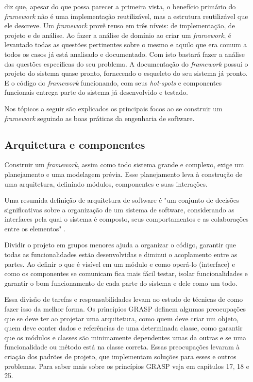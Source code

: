 \cite{Fayad1999} diz que, apesar do que possa parecer a primeira vista, o benefício primário do \textit{framework} não é uma implementação reutilizável, mas a estrutura reutilizável que ele descreve. Um \textit{framework} provê reuso em três níveis: de implementação, de projeto e de análise. Ao fazer a análise de domínio ao criar um \textit{framework}, é levantado todas as questões pertinentes sobre o mesmo e aquilo que era comum a todos os casos já está analisado e documentado. Com isto bastará fazer a análise das questões específicas do seu problema. A documentação do \textit{framework} possui o projeto do sistema quase pronto, fornecendo o esqueleto do seu sistema já pronto. E o código do \textit{framework} funcionando, com seus \textit{hot-spots} e componentes funcionais entrega parte do sistema já desenvolvido e testado.

Nos tópicos a seguir são explicados os principais focos ao se construir um \textit{framework} seguindo as boas práticas da engenharia de software.

\subsection{Arquitetura e componentes}

Construir um \textit{framework}, assim como todo sistema grande e complexo, exige um planejamento e uma modelagem prévia. Esse planejamento leva à construção de uma arquitetura, definindo módulos, componentes e suas interações.

Uma resumida definição de arquitetura de software é "um conjunto de decisões significativas sobre a organização de um sistema de software, considerando as interfaces pela qual o sistema é composto, seus comportamentos e as colaborações entre os elementos" \cite{Larman2005}.

Dividir o projeto em grupos menores ajuda a organizar o código, garantir que todas as funcionalidades estão desenvolvidas e diminui o acoplamento entre as partes. Ao definir o que é visível em um módulo e como operá-lo (interface) e como os componentes se comunicam fica mais fácil testar, isolar funcionalidades e garantir o bom funcionamento de cada parte do sistema e dele como um todo.

Essa divisão de tarefas e responsabilidades levam ao estudo de técnicas de como fazer isso da melhor forma. Os princípios GRASP definem algumas preocupações que se deve ter ao projetar uma arquitetura, como quem deve criar um objeto, quem deve conter dados e referências de uma determinada classe, como garantir que os módulos e classes são minimamente dependentes umas da outras e se uma funcionalidade ou método está na classe correta. Essas preocupações levaram à criação dos padrões de projeto, que implementam soluções para esses e outros problemas. Para saber mais sobre os princípios GRASP veja em \cite{Larman2005} capítulos 17, 18 e 25.


